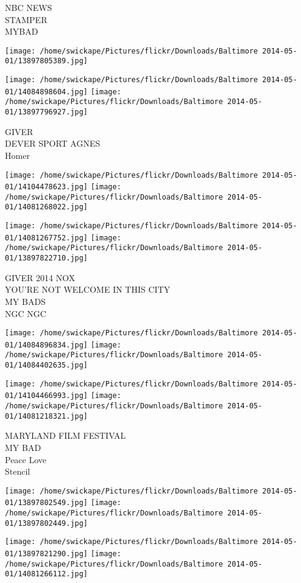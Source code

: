\documentclass[10pt,letterpaper]{article}
\begin{document}
NBC NEWS\\
STAMPER\\
MYBAD
\pagebreak

\texttt{[image: /home/swickape/Pictures/flickr/Downloads/Baltimore 2014-05-01/13897805389.jpg]}

\vspace{0.25in}
\texttt{[image: /home/swickape/Pictures/flickr/Downloads/Baltimore 2014-05-01/14084898604.jpg]}
\texttt{[image: /home/swickape/Pictures/flickr/Downloads/Baltimore 2014-05-01/13897796927.jpg]}

GIVER\\
DEVER SPORT AGNES\\
Homer
\pagebreak

\texttt{[image: /home/swickape/Pictures/flickr/Downloads/Baltimore 2014-05-01/14104478623.jpg]}
\texttt{[image: /home/swickape/Pictures/flickr/Downloads/Baltimore 2014-05-01/14081268022.jpg]}

\texttt{[image: /home/swickape/Pictures/flickr/Downloads/Baltimore 2014-05-01/14081267752.jpg]}
\texttt{[image: /home/swickape/Pictures/flickr/Downloads/Baltimore 2014-05-01/13897822710.jpg]}

GIVER 2014 NOX\\
YOU'RE NOT WELCOME IN THIS CITY\\
MY BADS\\
NGC NGC
\pagebreak

\texttt{[image: /home/swickape/Pictures/flickr/Downloads/Baltimore 2014-05-01/14084896834.jpg]}
\texttt{[image: /home/swickape/Pictures/flickr/Downloads/Baltimore 2014-05-01/14084402635.jpg]}

\texttt{[image: /home/swickape/Pictures/flickr/Downloads/Baltimore 2014-05-01/14104466993.jpg]}
\texttt{[image: /home/swickape/Pictures/flickr/Downloads/Baltimore 2014-05-01/14081218321.jpg]}

MARYLAND FILM FESTIVAL\\
MY BAD\\
Peace Love\\
Stencil
\pagebreak

\texttt{[image: /home/swickape/Pictures/flickr/Downloads/Baltimore 2014-05-01/13897802549.jpg]}
\texttt{[image: /home/swickape/Pictures/flickr/Downloads/Baltimore 2014-05-01/13897802449.jpg]}

\texttt{[image: /home/swickape/Pictures/flickr/Downloads/Baltimore 2014-05-01/13897821290.jpg]}
\texttt{[image: /home/swickape/Pictures/flickr/Downloads/Baltimore 2014-05-01/14081266112.jpg]}
\end{document}
